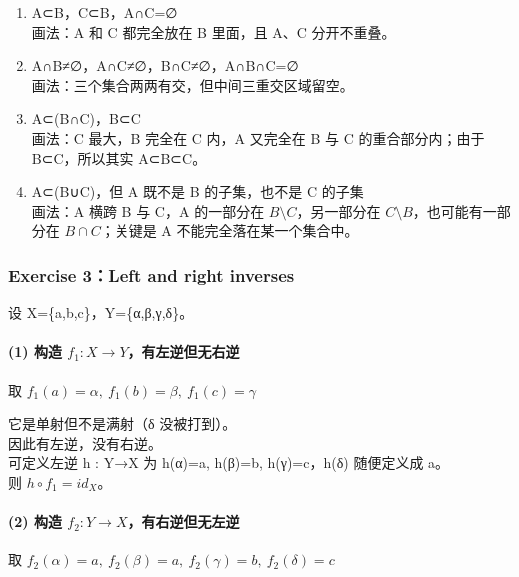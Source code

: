 \documentclass[
  11pt,
]{article}
\begin{document}
\begin{enumerate}
\def\labelenumi{\arabic{enumi}.}
\item
  A⊂B，C⊂B，A∩C=∅\\
  画法：A 和 C 都完全放在 B 里面，且 A、C 分开不重叠。
\item
  A∩B≠∅，A∩C≠∅，B∩C≠∅，A∩B∩C=∅\\
  画法：三个集合两两有交，但中间三重交区域留空。
\item
  A⊂(B∩C)，B⊂C\\
  画法：C 最大，B 完全在 C 内，A 又完全在 B 与 C 的重合部分内；由于
  B⊂C，所以其实 A⊂B⊂C。
\item
  A⊂(B∪C)，但 A 既不是 B 的子集，也不是 C 的子集\\
  画法：A 横跨 B 与 C，A 的一部分在 \(B\setminus C\)，另一部分在
  \(C\setminus B\)，也可能有一部分在 \(B\cap C\)；关键是 A
  不能完全落在某一个集合中。
\end{enumerate}

\subsubsection{Exercise 3：Left and right
inverses}\label{exercise-3left-and-right-inverses}

设 X=\{a,b,c\}，Y=\{α,β,γ,δ\}。

\paragraph{\texorpdfstring{(1) 构造
\(f_1 : X\to Y\)，有左逆但无右逆}{(1) 构造 f\_1 : X\textbackslash to Y，有左逆但无右逆}}\label{ux6784ux9020-f_1-xto-yux6709ux5de6ux9006ux4f46ux65e0ux53f3ux9006}

取 \(f_1(a)=\alpha,\ f_1(b)=\beta,\ f_1(c)=\gamma\)

它是单射但不是满射（δ 没被打到）。\\
因此有左逆，没有右逆。\\
可定义左逆 h : Y→X 为 h(α)=a, h(β)=b, h(γ)=c，h(δ) 随便定义成 a。\\
则 \(h\circ f_1 = id_X\)。

\paragraph{\texorpdfstring{(2) 构造
\(f_2 : Y\to X\)，有右逆但无左逆}{(2) 构造 f\_2 : Y\textbackslash to X，有右逆但无左逆}}\label{ux6784ux9020-f_2-yto-xux6709ux53f3ux9006ux4f46ux65e0ux5de6ux9006}

取 \(f_2(\alpha)=a,\ f_2(\beta)=a,\ f_2(\gamma)=b,\ f_2(\delta)=c\)
\end{document}
